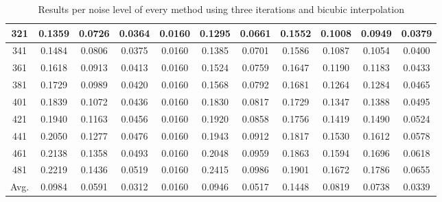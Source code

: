 \begin{table}[ht!]
\begin{tabular}{c|c|c|c|c|c|c|c|c|c|c}
321 & 0.1359 & 0.0726 & 0.0364 & 0.0160 & 0.1295 & 0.0661 & 0.1552 & 0.1008 & 0.0949 & 0.0379 \\ \hline
341 & 0.1484 & 0.0806 & 0.0375 & 0.0160 & 0.1385 & 0.0701 & 0.1586 & 0.1087 & 0.1054 & 0.0400 \\ \hline
361 & 0.1618 & 0.0913 & 0.0413 & 0.0160 & 0.1524 & 0.0759 & 0.1647 & 0.1190 & 0.1183 & 0.0433 \\ \hline
381 & 0.1729 & 0.0989 & 0.0420 & 0.0160 & 0.1568 & 0.0792 & 0.1681 & 0.1264 & 0.1284 & 0.0465 \\ \hline
401 & 0.1839 & 0.1072 & 0.0436 & 0.0160 & 0.1830 & 0.0817 & 0.1729 & 0.1347 & 0.1388 & 0.0495 \\ \hline
421 & 0.1940 & 0.1163 & 0.0456 & 0.0160 & 0.1920 & 0.0858 & 0.1756 & 0.1419 & 0.1490 & 0.0524 \\ \hline
441 & 0.2050 & 0.1277 & 0.0476 & 0.0160 & 0.1943 & 0.0912 & 0.1817 & 0.1530 & 0.1612 & 0.0578 \\ \hline
461 & 0.2138 & 0.1358 & 0.0493 & 0.0160 & 0.2048 & 0.0959 & 0.1863 & 0.1594 & 0.1696 & 0.0618 \\ \hline
481 & 0.2219 & 0.1436 & 0.0519 & 0.0160 & 0.2415 & 0.0986 & 0.1901 & 0.1672 & 0.1786 & 0.0655 \\ \hline
Avg.  & 0.0984 & 0.0591 & 0.0312 & 0.0160 & 0.0946 & 0.0517 & 0.1448 & 0.0819 & 0.0738 & 0.0339 \\ \hline
\end{tabular}
\caption{Results per noise level of every method using three  iterations and bicubic interpolation}
\label{tab:3itCperNoise}
\end{table}


